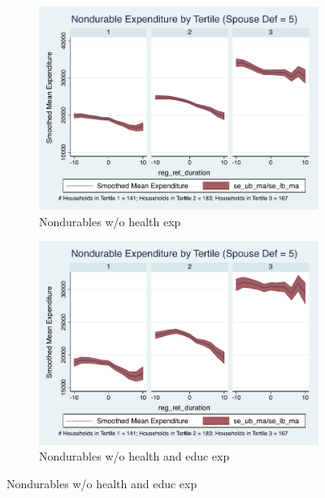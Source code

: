 \documentclass[11pt,onecolumn]{article}
\numberwithin{figure}{section}
\begin{document}
\begin{figure}
  \begin{subfigure}{0.5\textwidth}
  \centering
 	\includegraphics[width=0.9\linewidth]{../ConsumptionPostRetirement_by_SpouseDef/Smoothed_xhealth/spouse_def_5.pdf}
    \caption{Nondurables w/o health exp}
    \label{fig:chapter001_dist_001}
  \end{subfigure}
  	\hspace{1cm}
  \begin{subfigure}{0.5\textwidth}
 	\includegraphics[width=0.9\linewidth]{../ConsumptionPostRetirement_by_SpouseDef/Smoothed_xhealth_educ/spouse_def_5.pdf}
    \caption{Nondurables w/o health and educ exp}
    \label{fig:chapter001_reward_001}
  \end{subfigure}
\end{figure}
\clearpage
\end{document}
